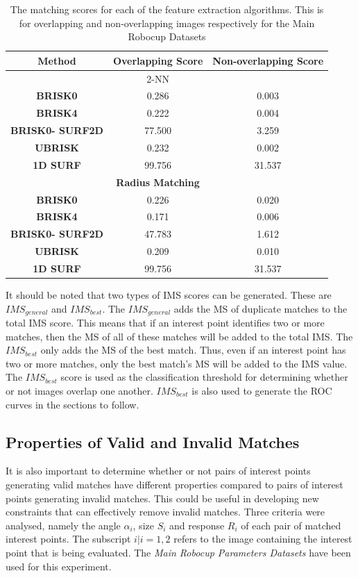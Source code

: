 \documentclass[11pt]{report}
\begin{document}
\begin{table}
\centering
\caption{The matching scores for each of the feature extraction algorithms. This is for overlapping and non-overlapping images respectively for the Main Robocup Datasets}
\begin{tabular}{|c|c|c|}
\hline 
\textbf{Method} & \textbf{Overlapping Score} & \textbf{Non-overlapping Score}\tabularnewline
\hline 
\hline 
 & 2-NN & \tabularnewline
\hline 
\textbf{BRISK0} & 0.286 & 0.003\tabularnewline
\hline 
\textbf{BRISK4} & 0.222 & 0.004\tabularnewline
\hline 
\textbf{BRISK0- SURF2D} & 77.500 & 3.259\tabularnewline
\hline 
\textbf{UBRISK} & 0.232 & 0.002\tabularnewline
\hline 
\textbf{1D SURF} & 99.756 & 31.537\tabularnewline
\hline 
 & \textbf{Radius Matching} & \tabularnewline
\hline 
\textbf{BRISK0} & 0.226 & 0.020\tabularnewline
\hline 
\textbf{BRISK4} & 0.171 & 0.006\tabularnewline
\hline 
\textbf{BRISK0- SURF2D} & 47.783 & 1.612\tabularnewline
\hline 
\textbf{UBRISK} & 0.209 & 0.010\tabularnewline
\hline 
\textbf{1D SURF} & 99.756 & 31.537\tabularnewline
\hline 
\end{tabular}
\label{tab:matchingScoreCompare}
\end{table}

It should be noted that two types of IMS scores can be generated. These are $IMS_{general}$ and $IMS_{best}$. The $IMS_{general}$ adds the MS of duplicate matches to the total IMS score. This means that if an interest point identifies two or more matches, then the MS of all of these matches will be added to the total IMS. The $IMS_{best}$ only adds the MS of the best match. Thus, even if an interest point has two or more matches, only the best match's MS will be added to the IMS value. The $IMS_{best}$ score is used as the classification threshold for determining whether or not images overlap one another. $IMS_{best}$ is also used to generate the ROC curves in the sections to follow. \\



\subsection{Properties of Valid and Invalid Matches}
\label{sec:keypointMatching}
It is also important to determine whether or not pairs of interest points generating valid matches have different properties compared to pairs of interest points generating invalid matches. This could be useful in developing new constraints that can effectively remove invalid matches. Three criteria were analysed, namely the angle $\alpha_i$, size $S_i$ and response $R_i$ of each pair of matched interest points. The subscript $i|i={1,2}$ refers to the image containing the interest point that is being evaluated. The \textit{Main Robocup Parameters Datasets} have been used for this experiment.\\
\end{document}
